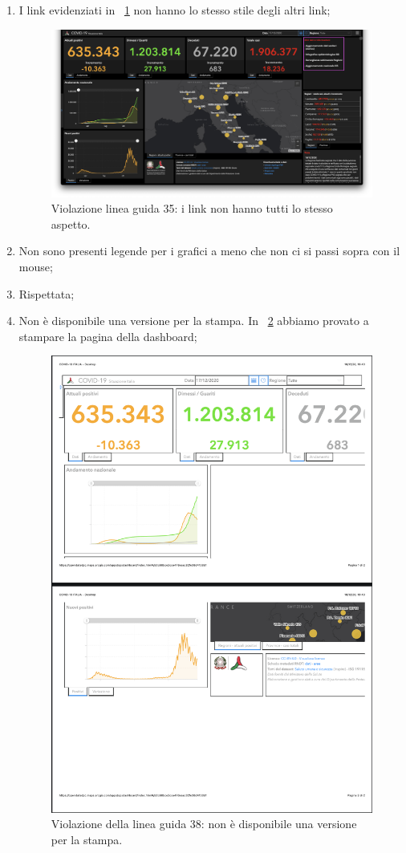\begin{enumerate}
    \item I link evidenziati in ~\ref{fig:guidelines-violations-13} non hanno lo stesso stile degli altri link;
        \begin{figure}[H]
            \centering
            \includegraphics[width=0.5\columnwidth]{../../../assets/images/verifica-risorse-esistenti/guidelines_violations_15.png}
            \caption{Violazione linea guida 35: i link non hanno tutti lo stesso aspetto.}
            \label{fig:guidelines-violations-13}
        \end{figure}
    \item Non sono presenti legende per i grafici a meno che non ci si passi sopra con il mouse;
    \item Rispettata;
    \item Non è disponibile una versione per la stampa. In ~\ref{fig:guidelines-violations-14} abbiamo provato a stampare la pagina della dashboard;
        \begin{figure}[H]
            \centering
            \includegraphics[width=0.5\columnwidth]{../../../assets/images/verifica-risorse-esistenti/guidelines_violations_16.png}
            \caption{Violazione della linea guida 38: non è disponibile una versione per la stampa.}
            \label{fig:guidelines-violations-14}
        \end{figure}

\end{enumerate}
